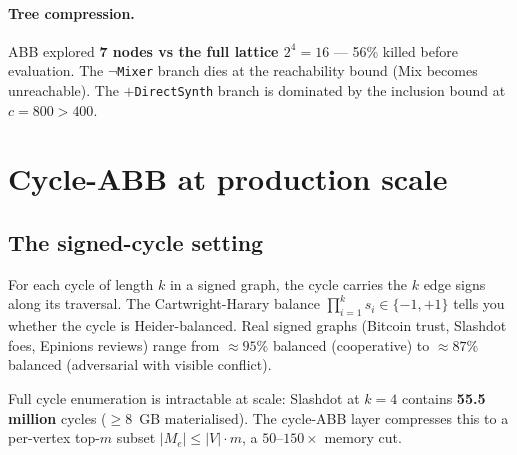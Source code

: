 \documentclass[11pt,a4paper]{article}
\newcommand{\code}[1]{\texttt{\small #1}}
\begin{document}
\paragraph{Tree compression.} ABB explored \textbf{7 nodes vs the full
lattice $2^4 = 16$} --- 56\% killed before evaluation. The
\code{$\lnot$Mixer} branch dies at the reachability bound (Mix becomes
unreachable). The \code{$+$DirectSynth} branch is dominated by the
inclusion bound at $c = 800 > 400$.

\begin{center}
\end{center}

\section{Cycle-ABB at production scale}

\subsection{The signed-cycle setting}

For each cycle of length $k$ in a signed graph, the cycle carries
the $k$ edge signs along its traversal. The Cartwright-Harary balance
$\prod_{i=1}^{k} s_i \in \{-1, +1\}$ tells you whether the cycle is
Heider-balanced. Real signed graphs (Bitcoin trust, Slashdot foes,
Epinions reviews) range from $\approx 95\%$ balanced (cooperative)
to $\approx 87\%$ balanced (adversarial with visible conflict).

Full cycle enumeration is intractable at scale: Slashdot at $k = 4$
contains \textbf{55.5 million} cycles ($\geq 8$~GB materialised).
The cycle-ABB layer compresses this to a per-vertex top-$m$
subset $|M_e| \leq |V| \cdot m$, a $50$--$150\times$ memory cut.
\end{document}
